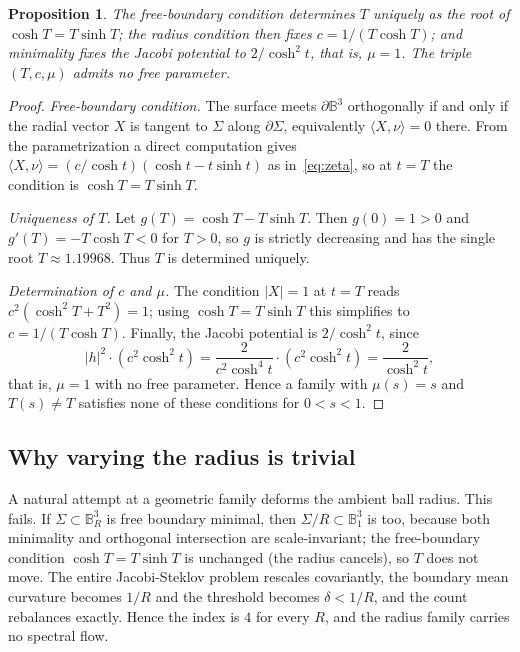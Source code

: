 \documentclass[11pt]{article}
\theoremstyle{definition}
\theoremstyle{plain}
\newtheorem{proposition}[theorem]{Proposition}
\begin{document}
\begin{proposition}\label{prop:rigid}
	The free-boundary condition determines $T$ uniquely as the root of $\cosh T = T\sinh T$; the radius condition then fixes $c = 1/(T\cosh T)$; and minimality fixes the Jacobi potential to $2/\cosh^2 t$, that is, $\mu = 1$. The triple $(T, c, \mu)$ admits no free parameter.
\end{proposition}

\begin{proof}
	\emph{Free-boundary condition.} The surface meets $\partial\mathbb{B}^3$ orthogonally if and only if the radial vector $X$ is tangent to $\Sigma$ along $\partial\Sigma$, equivalently $\langle X, \nu\rangle = 0$ there. From the parametrization a direct computation gives $\langle X, \nu\rangle = (c/\cosh t)(\cosh t - t\sinh t)$ as in~\eqref{eq:zeta}, so at $t = T$ the condition is $\cosh T = T\sinh T$.

	\emph{Uniqueness of $T$.} Let $g(T) = \cosh T - T\sinh T$. Then $g(0) = 1 > 0$ and $g'(T) = -T\cosh T < 0$ for $T > 0$, so $g$ is strictly decreasing and has the single root $T \approx 1.19968$. Thus $T$ is determined uniquely.

	\emph{Determination of $c$ and $\mu$.} The condition $|X| = 1$ at $t = T$ reads $c^2(\cosh^2 T + T^2) = 1$; using $\cosh T = T\sinh T$ this simplifies to $c = 1/(T\cosh T)$. Finally, the Jacobi potential is $2/\cosh^2 t$, since
	\begin{equation}
		|h|^2 \cdot (c^2\cosh^2 t) = \frac{2}{c^2\cosh^4 t}\cdot(c^2\cosh^2 t) = \frac{2}{\cosh^2 t},
	\end{equation}
	that is, $\mu = 1$ with no free parameter. Hence a family with $\mu(s) = s$ and $T(s)\neq T$ satisfies none of these conditions for $0 < s < 1$.
\end{proof}

\subsection{Why varying the radius is trivial}

A natural attempt at a geometric family deforms the ambient ball radius. This fails. If $\Sigma \subset \mathbb{B}^3_R$ is free boundary minimal, then $\Sigma/R \subset \mathbb{B}^3_1$ is too, because both minimality and orthogonal intersection are scale-invariant; the free-boundary condition $\cosh T = T\sinh T$ is unchanged (the radius cancels), so $T$ does not move. The entire Jacobi-Steklov problem rescales covariantly, the boundary mean curvature becomes $1/R$ and the threshold becomes $\delta < 1/R$, and the count rebalances exactly. Hence the index is $4$ for every $R$, and the radius family carries no spectral flow.
\end{document}
